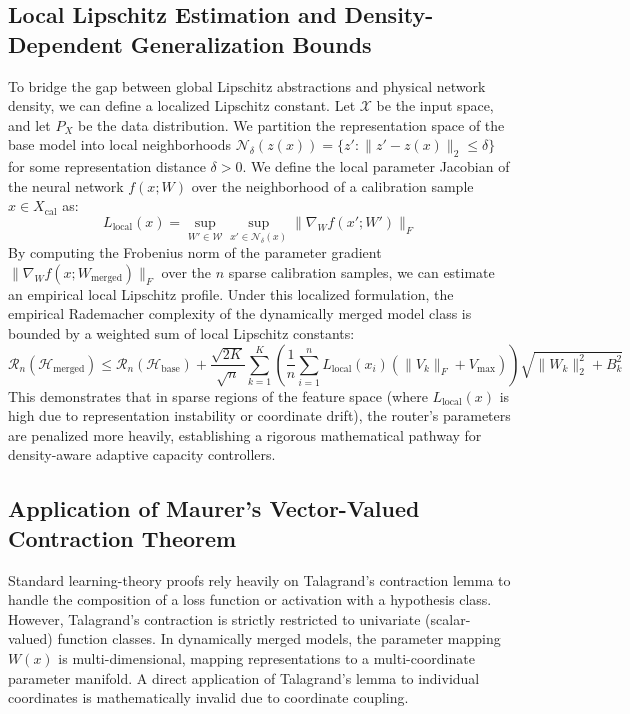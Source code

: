 \documentclass{article}
\theoremstyle{plain}
\theoremstyle{definition}
\theoremstyle{remark}
\begin{document}
\subsection{Local Lipschitz Estimation and Density-Dependent Generalization Bounds}
To bridge the gap between global Lipschitz abstractions and physical network density, we can define a localized Lipschitz constant. Let $\mathcal{X}$ be the input space, and let $P_X$ be the data distribution. We partition the representation space of the base model into local neighborhoods $\mathcal{N}_\delta(z(x)) = \{ z' : \|z' - z(x)\|_2 \le \delta \}$ for some representation distance $\delta > 0$. We define the local parameter Jacobian of the neural network $f(x; W)$ over the neighborhood of a calibration sample $x \in X_{\text{cal}}$ as:
\begin{equation}
    L_{\text{local}}(x) = \sup_{W' \in \mathcal{W}} \sup_{x' \in \mathcal{N}_\delta(x)} \|\nabla_W f(x'; W')\|_F
\end{equation}
By computing the Frobenius norm of the parameter gradient $\|\nabla_W f(x; W_{\text{merged}})\|_F$ over the $n$ sparse calibration samples, we can estimate an empirical local Lipschitz profile. Under this localized formulation, the empirical Rademacher complexity of the dynamically merged model class is bounded by a weighted sum of local Lipschitz constants:
\begin{equation}
    \mathcal{R}_n(\mathcal{H}_{\text{merged}}) \le \mathcal{R}_n(\mathcal{H}_{\text{base}}) + \frac{\sqrt{2K}}{\sqrt{n}} \sum_{k=1}^K \left( \frac{1}{n} \sum_{i=1}^n L_{\text{local}}(x_i) \left( \|V_k\|_F + V_{\max} \right) \right) \sqrt{\|W_k\|_2^2 + B_k^2}
\end{equation}
This demonstrates that in sparse regions of the feature space (where $L_{\text{local}}(x)$ is high due to representation instability or coordinate drift), the router's parameters are penalized more heavily, establishing a rigorous mathematical pathway for density-aware adaptive capacity controllers.

\subsection{Application of Maurer's Vector-Valued Contraction Theorem}
Standard learning-theory proofs rely heavily on Talagrand's contraction lemma to handle the composition of a loss function or activation with a hypothesis class. However, Talagrand's contraction is strictly restricted to univariate (scalar-valued) function classes. In dynamically merged models, the parameter mapping $W(x)$ is multi-dimensional, mapping representations to a multi-coordinate parameter manifold. A direct application of Talagrand's lemma to individual coordinates is mathematically invalid due to coordinate coupling.
\end{document}
